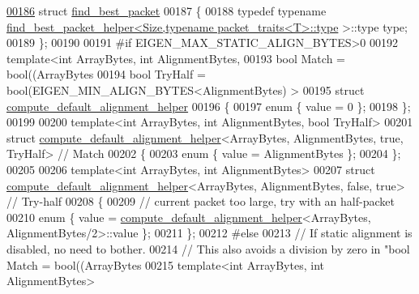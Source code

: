 \begin{DoxyCode}
\hyperlink{struct_eigen_1_1internal_1_1find__best__packet}{00186} \textcolor{keyword}{struct }\hyperlink{struct_eigen_1_1internal_1_1find__best__packet}{find\_best\_packet}
00187 \{
00188   \textcolor{keyword}{typedef} \textcolor{keyword}{typename} \hyperlink{struct_eigen_1_1internal_1_1find__best__packet__helper}{find\_best\_packet\_helper<Size,typename packet\_traits<T>::type}
      >::type type;
00189 \};
00190 
00191 \textcolor{preprocessor}{#if EIGEN\_MAX\_STATIC\_ALIGN\_BYTES>0}
00192 \textcolor{keyword}{template}<\textcolor{keywordtype}{int} ArrayBytes, \textcolor{keywordtype}{int} AlignmentBytes,
00193          \textcolor{keywordtype}{bool} Match     =  bool((ArrayBytes%
00194          \textcolor{keywordtype}{bool} TryHalf   =  bool(EIGEN\_MIN\_ALIGN\_BYTES<AlignmentBytes) >
00195 \textcolor{keyword}{struct }\hyperlink{struct_eigen_1_1internal_1_1compute__default__alignment__helper}{compute\_default\_alignment\_helper}
00196 \{
00197   \textcolor{keyword}{enum} \{ value = 0 \};
00198 \};
00199 
00200 \textcolor{keyword}{template}<\textcolor{keywordtype}{int} ArrayBytes, \textcolor{keywordtype}{int} AlignmentBytes, \textcolor{keywordtype}{bool} TryHalf>
00201 \textcolor{keyword}{struct }\hyperlink{struct_eigen_1_1internal_1_1compute__default__alignment__helper}{compute\_default\_alignment\_helper}<ArrayBytes, AlignmentBytes, true, 
      TryHalf> \textcolor{comment}{// Match}
00202 \{
00203   \textcolor{keyword}{enum} \{ value = AlignmentBytes \};
00204 \};
00205 
00206 \textcolor{keyword}{template}<\textcolor{keywordtype}{int} ArrayBytes, \textcolor{keywordtype}{int} AlignmentBytes>
00207 \textcolor{keyword}{struct }\hyperlink{struct_eigen_1_1internal_1_1compute__default__alignment__helper}{compute\_default\_alignment\_helper}<ArrayBytes, AlignmentBytes, false, 
      true> \textcolor{comment}{// Try-half}
00208 \{
00209   \textcolor{comment}{// current packet too large, try with an half-packet}
00210   \textcolor{keyword}{enum} \{ value = \hyperlink{struct_eigen_1_1internal_1_1compute__default__alignment__helper}{compute\_default\_alignment\_helper}<ArrayBytes, 
      AlignmentBytes/2>::value \};
00211 \};
00212 \textcolor{preprocessor}{#else}
00213 \textcolor{comment}{// If static alignment is disabled, no need to bother.}
00214 \textcolor{comment}{// This also avoids a division by zero in "bool Match =  bool((ArrayBytes%
00215 \textcolor{keyword}{template}<\textcolor{keywordtype}{int} ArrayBytes, \textcolor{keywordtype}{int} AlignmentBytes>
}
\end{DoxyCode}
